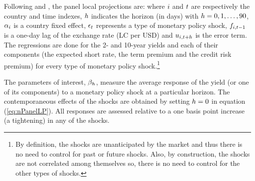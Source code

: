 {Following \cite{Jorda:2005} and \cite{ACDM:2019}, the panel local projections are:
\noindent where \(i\) and \(t\) are respectively the country and time indexes, \(h\) indicates the horizon (in days) with \(h = 0, 1, \ldots, 90\),  \(\alpha_{i}\) is a country fixed effect, \(\epsilon_{t}\) represents a type of monetary policy shock, \(f_{i,{t-1}}\) is a one-day lag of the exchange rate (LC per USD) and \(u_{i,{t+h}}\) is the error term.
The regressions are done for the 2- and 10-year yields and each of their components (the expected short rate, the term premium and the credit risk premium) for every type of monetary policy shock.\footnote{ By definition, the shocks are unanticipated by the market and thus there is no need to control for past or future shocks. Also, by construction, the shocks are not correlated among themselves so, there is no need to control for the other types of shocks.}

The parameters of interest, \(\beta_{h}\), measure the average response of the yield (or one of its components) to a monetary policy shock at a particular horizon.
The contemporaneous effects of the shocks are obtained by setting \(h = 0\) in equation (\ref{eq:nPanelLP}).
All responses are assessed relative to a one basis point increase (a tightening) in any of the shocks.


}
